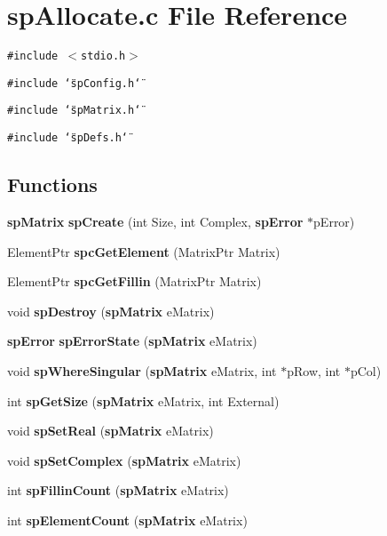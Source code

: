\section{sp\-Allocate.c File Reference}
\label{spAllocate_8c}
{\tt \#include $<$stdio.h$>$}\par
{\tt \#include \char`\"{}sp\-Config.h\char`\"{}}\par
{\tt \#include \char`\"{}sp\-Matrix.h\char`\"{}}\par
{\tt \#include \char`\"{}sp\-Defs.h\char`\"{}}\par
\subsection*{Functions}
\begin{CompactItemize}
\item 
{\bf sp\-Matrix} {\bf sp\-Create} (int Size, int Complex, {\bf sp\-Error} $\ast$p\-Error)
\item 
{}
Element\-Ptr {\bf spc\-Get\-Element} (Matrix\-Ptr Matrix)\label{spAllocate_8c_a12}

\item 
{}
Element\-Ptr {\bf spc\-Get\-Fillin} (Matrix\-Ptr Matrix)\label{spAllocate_8c_a13}

\item 
void {\bf sp\-Destroy} ({\bf sp\-Matrix} e\-Matrix)
\item 
{\bf sp\-Error} {\bf sp\-Error\-State} ({\bf sp\-Matrix} e\-Matrix)
\item 
void {\bf sp\-Where\-Singular} ({\bf sp\-Matrix} e\-Matrix, int $\ast$p\-Row, int $\ast$p\-Col)
\item 
int {\bf sp\-Get\-Size} ({\bf sp\-Matrix} e\-Matrix, int External)
\item 
void {\bf sp\-Set\-Real} ({\bf sp\-Matrix} e\-Matrix)
\item 
void {\bf sp\-Set\-Complex} ({\bf sp\-Matrix} e\-Matrix)
\item 
int {\bf sp\-Fillin\-Count} ({\bf sp\-Matrix} e\-Matrix)
\item 
int {\bf sp\-Element\-Count} ({\bf sp\-Matrix} e\-Matrix)
\end{CompactItemize}
